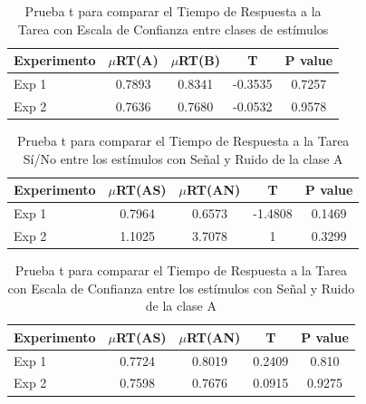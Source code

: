 \begin{table}
\caption[Tiempo de Respuesta a la Escala de Confianza por clase de estímulo]{Prueba t para comparar el Tiempo de Respuesta a la Tarea con Escala de Confianza entre clases de estímulos}
\label{Tabla_RT2_AB}
\centering
\begin{tabular}{l |  c c c c}
\toprule
\textbf{Experimento} & \textbf{$\mu$RT(A)} & \textbf{$\mu$RT(B)} & \textbf{T} & \textbf{P value}\\
\midrule
Exp 1 & 0.7893 & 0.8341 & -0.3535 & 0.7257 \\
Exp 2 & 0.7636 & 0.7680 & -0.0532 & 0.9578 \\
\bottomrule
\end{tabular}
\end{table}

\begin{table}
\caption[Tiempo de Respuesta a la tarea Sí/No para la clase A (Señal vs Ruido)]{Prueba t para comparar el Tiempo de Respuesta a la Tarea Sí/No entre los estímulos con Señal y Ruido de la clase A}
\label{Tabla_RT1_A}
\centering
\begin{tabular}{l |  c c c c}
\toprule
\textbf{Experimento} & \textbf{$\mu$RT(AS)} & \textbf{$\mu$RT(AN)} & \textbf{T} & \textbf{P value}\\
\midrule
Exp 1 & 0.7964 & 0.6573 & -1.4808 & 0.1469 \\
Exp 2 & 1.1025 & 3.7078 & 1 & 0.3299 \\
\bottomrule
\end{tabular}
\end{table}

\begin{table}
\caption[Tiempo de Respuesta a la tarea Sí/No para la clase A (Señal vs Ruido)]{Prueba t para comparar el Tiempo de Respuesta a la Tarea con Escala de Confianza entre los estímulos con Señal y Ruido de la clase A}
\label{Tabla_RT2_A}
\centering
\begin{tabular}{l | c c c c}
\toprule
\textbf{Experimento} & \textbf{$\mu$RT(AS)} & \textbf{$\mu$RT(AN)} & \textbf{T} & \textbf{P value}\\
\midrule
Exp 1 & 0.7724 & 0.8019 & 0.2409 & 0.810 \\
Exp 2 & 0.7598 & 0.7676 & 0.0915 & 0.9275  \\
\bottomrule
\end{tabular}
\end{table}


